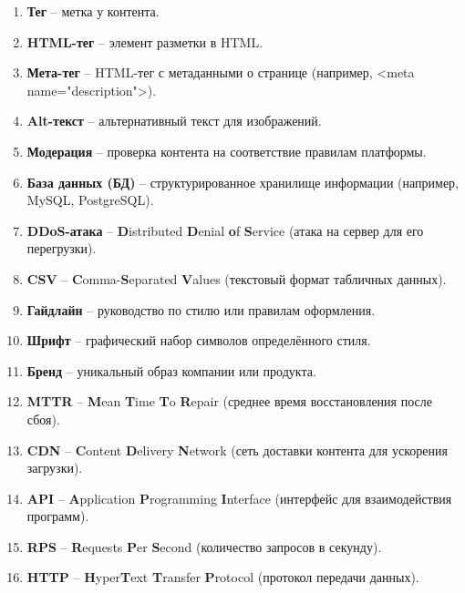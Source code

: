 \documentclass{scrreprt}
\begin{document}
\begin{enumerate}
\item\textbf{Тег} – метка у контента.

\item\textbf{HTML-тег} – элемент разметки в HTML.

\item\textbf{Мета-тег} – HTML-тег с метаданными о странице (например, <meta name="description">).

\item\textbf{Alt-текст} – альтернативный текст для изображений.

\item\textbf{Модерация} – проверка контента на соответствие правилам платформы.

\item\textbf{База данных (БД)} – структурированное хранилище информации (например, MySQL, PostgreSQL).

\item\textbf{DDoS-атака} – \textbf{D}istributed \textbf{D}enial \textbf{o}f \textbf{S}ervice (атака на сервер для его перегрузки).

\item\textbf{CSV} – \textbf{C}omma-\textbf{S}eparated \textbf{V}alues (текстовый формат табличных данных).

\item\textbf{Гайдлайн} – руководство по стилю или правилам оформления.

\item\textbf{Шрифт} – графический набор символов определённого стиля.

\item\textbf{Бренд} – уникальный образ компании или продукта.

\item\textbf{MTTR} – \textbf{M}ean \textbf{T}ime \textbf{T}o \textbf{R}epair (среднее время восстановления после сбоя).

\item\textbf{CDN} – \textbf{C}ontent \textbf{D}elivery \textbf{N}etwork (сеть доставки контента для ускорения загрузки).

\item\textbf{API} – \textbf{A}pplication \textbf{P}rogramming \textbf{I}nterface (интерфейс для взаимодействия программ).

\item\textbf{RPS} – \textbf{R}equests \textbf{P}er \textbf{S}econd (количество запросов в секунду).

\item\textbf{HTTP} – \textbf{H}yper\textbf{T}ext \textbf{T}ransfer \textbf{P}rotocol (протокол передачи данных).


\end{enumerate}
\end{document}
